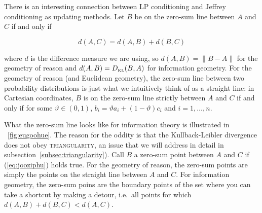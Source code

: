 \documentclass[phd,12pt,oneside]{ubcthesis}
\begin{document}
There is an interesting connection between LP conditioning and Jeffrey
conditioning as updating methods. Let $B$ be on the zero-sum line
between $A$ and $C$ if and only if

\begin{equation}
\label{eq:jooziphu}
d(A,C)=d(A,B)+d(B,C)
\end{equation}

{\noindent}where $d$ is the difference measure we are using, so $d(A,B)=\|B-A\|$
for the geometry of reason and $d(A,B)=D_{\mbox{\tiny KL}}(B,A)$ for
information geometry. For the geometry of reason (and Euclidean
geometry), the zero-sum line between two probability distributions is
just what we intuitively think of as a straight line: in Cartesian
coordinates, $B$ is on the zero-sum line strictly between $A$ and $C$
if and only if for some $\vartheta\in(0,1)$,
$b_{i}=\vartheta{}a_{i}+(1-\vartheta)c_{i}$ and $i=1,\ldots,n$.

What the zero-sum line looks like for information theory is
illustrated in {\igure}~\ref{fig:eugoohue}. The reason for the oddity is
that the Kullback-Leibler divergence does not obey
\textsc{triangularity}, an issue that we will address in detail in
subsection~\ref{subsec:triangularity}). Call $B$ a zero-sum point
between $A$ and $C$ if (\ref{eq:jooziphu}) holds true. For the
geometry of reason, the zero-sum points are simply the points on the
straight line between $A$ and $C$. For information geometry, the
zero-sum poins are the boundary points of the set where you can take a
shortcut by making a detour, i.e.\ all points for which
$d(A,B)+d(B,C)<d(A,C)$.
\end{document}
